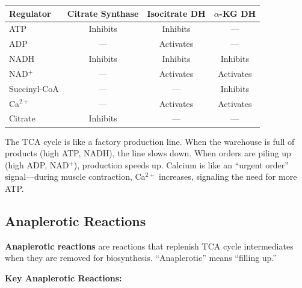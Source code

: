 \begin{center}
\begin{tabular}{lccc}
\toprule
\textbf{Regulator} & \textbf{Citrate Synthase} & \textbf{Isocitrate DH} & \textbf{$\alpha$-KG DH} \\
\midrule
ATP & Inhibits & Inhibits & — \\
ADP & — & Activates & — \\
NADH & Inhibits & Inhibits & Inhibits \\
NAD$^+$ & — & Activates & Activates \\
Succinyl-CoA & — & — & Inhibits \\
Ca$^{2+}$ & — & Activates & Activates \\
Citrate & Inhibits & — & — \\
\bottomrule
\end{tabular}
\end{center}

\begin{analogy}
The TCA cycle is like a factory production line. When the warehouse is full of products (high ATP, NADH), the line slows down. When orders are piling up (high ADP, NAD$^+$), production speeds up. Calcium is like an ``urgent order'' signal—during muscle contraction, Ca$^{2+}$ increases, signaling the need for more ATP.
\end{analogy}

\subsection{Anaplerotic Reactions}

\begin{definition}
\textbf{Anaplerotic reactions} are reactions that replenish TCA cycle intermediates when they are removed for biosynthesis. ``Anaplerotic'' means ``filling up.''
\end{definition}

\textbf{Key Anaplerotic Reactions:}

